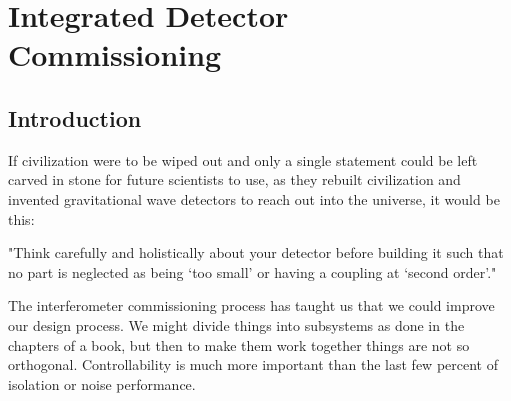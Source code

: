 \chapter[Integrated Detector Commissioning]{Integrated Detector Commissioning}
\label{IDC}



%
%
%

\section{Introduction}
\label{s:IDC:Intro}
If civilization were to be wiped out and only a single statement could be left
carved in stone for future scientists to use, as they rebuilt civilization and
invented gravitational wave detectors to reach out into the universe,
it would be this:

"Think carefully and holistically about your detector before building it
such that no part is neglected as being `too small' or having a coupling at `second order'."

The interferometer commissioning process has taught us that we could improve
our design process. We might divide things into subsystems as done in the chapters of a book, but then to make them work together things are not so orthogonal. Controllability is much more important than the last few percent of isolation or noise performance.

